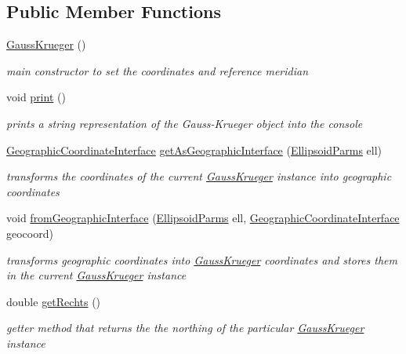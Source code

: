 \subsection*{Public Member Functions}
\begin{DoxyCompactItemize}
\item 
\hyperlink{classcoordinates_1_1_gauss_krueger_a59a320d5d406e0e88df19f2a1c6cc9fc}{Gauss\+Krueger} ()
\begin{DoxyCompactList}\small\item\em main constructor to set the coordinates and reference meridian \end{DoxyCompactList}\item 
void \hyperlink{classcoordinates_1_1_gauss_krueger_a68b8bf6307cf0c9732f5034d8cf70df8}{print} ()
\begin{DoxyCompactList}\small\item\em prints a string representation of the Gauss-\/\+Krueger object into the console \end{DoxyCompactList}\item 
\hyperlink{classcoordinates_1_1_geographic_coordinate_interface}{Geographic\+Coordinate\+Interface} \hyperlink{classcoordinates_1_1_gauss_krueger_a3b7d9043de1a8cbff07dd692244938d5}{get\+As\+Geographic\+Interface} (\hyperlink{classparams_1_1_ellipsoid_parms}{Ellipsoid\+Parms} ell)
\begin{DoxyCompactList}\small\item\em transforms the coordinates of the current \hyperlink{classcoordinates_1_1_gauss_krueger}{Gauss\+Krueger} instance into geographic coordinates \end{DoxyCompactList}\item 
void \hyperlink{classcoordinates_1_1_gauss_krueger_ab7f6aa06c6d9e4ce8216edda33143458}{from\+Geographic\+Interface} (\hyperlink{classparams_1_1_ellipsoid_parms}{Ellipsoid\+Parms} ell, \hyperlink{classcoordinates_1_1_geographic_coordinate_interface}{Geographic\+Coordinate\+Interface} geocoord)
\begin{DoxyCompactList}\small\item\em transforms geographic coordinates into \hyperlink{classcoordinates_1_1_gauss_krueger}{Gauss\+Krueger} coordinates and stores them in the current \hyperlink{classcoordinates_1_1_gauss_krueger}{Gauss\+Krueger} instance \end{DoxyCompactList}\item 
double \hyperlink{classcoordinates_1_1_gauss_krueger_a11b882d972f2068f8447ea07df0bd4db}{get\+Rechts} ()
\begin{DoxyCompactList}\small\item\em getter method that returns the the northing of the particular \hyperlink{classcoordinates_1_1_gauss_krueger}{Gauss\+Krueger} instance \end{DoxyCompactList}\item 

\end{DoxyCompactItemize}
